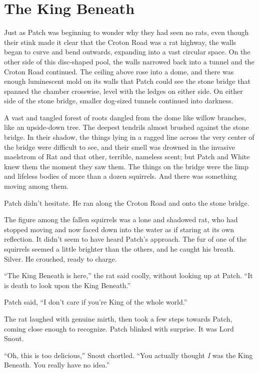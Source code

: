 \documentclass[ebook,oneside,openany,12pt]{memoir}
\begin{document}

\section{The King Beneath}

Just as Patch was beginning to wonder why they had seen no rats, even
though their stink made it clear that the Croton Road was a rat
highway, the walls began to curve and bend outwards, expanding into a
vast circular space. On the other side of this disc-shaped pool, the
walls narrowed back into a tunnel and the Croton Road continued. The
ceiling above rose into a dome, and there was enough luminescent mold
on its walls that Patch could see the stone bridge that spanned the
chamber crosswise, level with the ledges on either side. On either
side of the stone bridge, smaller dog-sized tunnels continued into
darkness.

A vast and tangled forest of roots dangled from the dome like willow
branches, like an upside-down tree. The deepest tendrils almost
brushed against the stone bridge. In their shadow, the things lying in
a ragged line across the very center of the bridge were difficult to
see, and their smell was drowned in the invasive maelstrom of Rat and
that other, terrible, nameless scent; but Patch and White knew them
the moment they saw them. The things on the bridge were the limp and
lifeless bodies of more than a dozen squirrels. And there was
something moving among them.

Patch didn’t hesitate. He ran along the Croton Road and onto the stone
bridge.

The figure among the fallen squirrels was a lone and shadowed rat, who
had stopped moving and now faced down into the water as if staring at
its own reflection. It didn’t seem to have heard Patch’s approach. The
fur of one of the squirrels seemed a little brighter than the others,
and he caught his breath. Silver. He crouched, ready to charge.

“The King Beneath is here,” the rat said coolly, without looking up at
Patch. “It is death to look upon the King Beneath.”

Patch said, “I don’t care if you’re King of the whole world.”

The rat laughed with genuine mirth, then took a few steps towards
Patch, coming close enough to recognize. Patch blinked with
surprise. It was Lord Snout.

“Oh, this is too delicious,” Snout chortled. “You actually thought
\emph{I} was the King Beneath. You really have no idea.”
\end{document}
